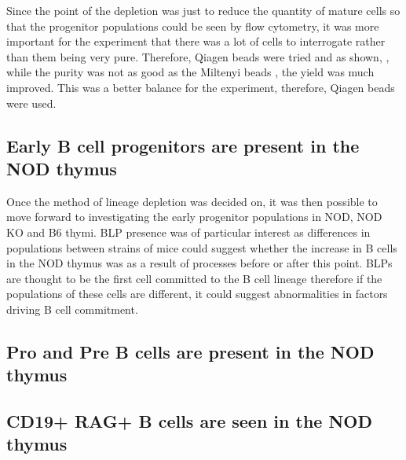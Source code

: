 Since the point of the depletion was just to reduce the quantity of mature cells so that the progenitor populations could be seen by flow cytometry, it was more important for the experiment that there was a lot of cells to interrogate rather than them being very pure.
Therefore, Qiagen beads were tried and as shown, , while the purity was not as good as the Miltenyi beads , the yield was much improved.
This was a better balance for the experiment, therefore, Qiagen beads were used.

\subsection{Early B cell progenitors are present in the NOD thymus}
Once the method of lineage depletion was decided on, it was then possible to move forward to investigating the early progenitor populations in NOD, NOD KO and B6 thymi.
BLP presence was of particular interest as differences in populations between strains of mice could suggest whether the increase in B cells in the NOD thymus was as a result of processes before or after this point.
BLPs are thought to be the first cell committed to the B cell lineage therefore if the populations of these cells are different, it could suggest abnormalities in factors driving B cell commitment.



\subsection{Pro and Pre B cells are present in the NOD thymus}



\subsection{CD19+ RAG+ B cells are seen in the NOD thymus}

